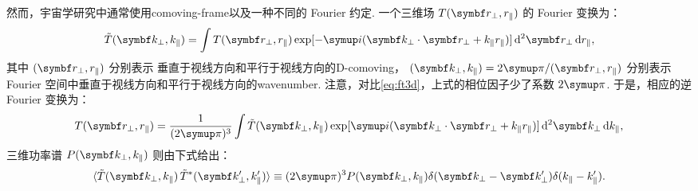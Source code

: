 然而，宇宙学研究中通常使用\ac{comoving-frame}以及一种不同的 Fourier 约定.
一个三维场 $T(\B{r}_{\perp}, r_{\parallel})$ 的 Fourier 变换为：
\begin{equation}
  \label{eq:ft3d-k}
  \tilde{T}(\B{k}_{\perp}, k_{\parallel}) =
    \int T(\B{r}_{\perp}, r_{\parallel})
    \exp[ -\Ci (\B{k}_{\perp} \cdot \B{r}_{\perp}
      + k_{\parallel} r_{\parallel}) ]
    \,\mathrm{d}^2\B{r}_{\perp} \,\D{r}_{\parallel} ,
\end{equation}
其中 $(\B{r}_{\perp}, r_{\parallel})$ 分别表示
垂直于视线方向和平行于视线方向的\acl{D-comoving}，
$(\B{k}_{\perp}, k_{\parallel}) = 2\Cpi / (\B{r}_{\perp}, r_{\parallel})$
分别表示 Fourier 空间中垂直于视线方向和平行于视线方向的\ac{wavenumber}.
注意，对比\autoref{eq:ft3d}，上式的相位因子少了系数 $2\Cpi$.
于是，相应的逆 Fourier 变换为：
\begin{equation}
  T(\B{r}_{\perp}, r_{\parallel}) =
    \frac{1}{(2\Cpi)^3} \int \tilde{T}(\B{k}_{\perp}, k_{\parallel})
    \exp[ \Ci (\B{k}_{\perp} \cdot \B{r}_{\perp}
      + k_{\parallel} r_{\parallel}) ]
    \,\mathrm{d}^2\B{k}_{\perp} \,\D{k}_{\parallel} ,
\end{equation}
三维功率谱 $P(\B{k}_{\perp}, k_{\parallel})$ 则由下式给出：
\begin{equation}
  \label{eq:ps3d-k}
  \langle \tilde{T}(\B{k}_{\perp}, k_{\parallel})
      \, \tilde{T}^*(\B{k}'_{\perp}, k'_{\parallel}) \rangle
    \equiv (2\Cpi)^3 P(\B{k}_{\perp}, k_{\parallel})
      \delta(\B{k}_{\perp} - \B{k}'_{\perp})
      \delta(k_{\parallel} - k'_{\parallel}) .
\end{equation}

